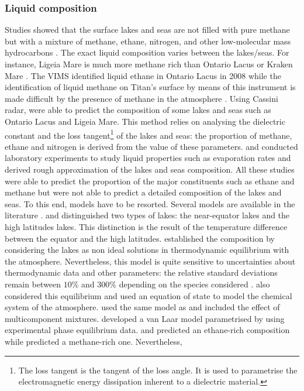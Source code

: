 \subsubsection{Liquid composition}
\label{sec:intro:composition}
Studies showed that the surface lakes and seas are not filled with pure methane but with a mixture of methane, ethane, nitrogen, and other low-molecular mass hydrocarbons \citep{ mastrogiuseppe2014bathymetry,luspay2015experimental,mitchell2015laboratory, tan2013titan,tan2015titan}. The exact liquid composition varies between the lakes/seas. For instance, Ligeia Mare is much more methane rich than Ontario Lacus or Kraken Mare \citep{hayes2016bathymetry,le2016composition}. The VIMS identified liquid ethane in Ontario Lacus in 2008 while the identification of liquid methane on Titan's surface by means of this instrument is made difficult by the presence of methane in the atmosphere \citep{brown2008identification}. Using Cassini radar, \citep{mastrogiuseppe2014bathymetry,hayes2016bathymetry,le2016composition} were able to predict the composition of some lakes and seas such as Ontario Lacus and Ligeia Mare. This method relies on analysing the dielectric constant and the loss tangent\footnote{The loss tangent is the tangent of the loss angle. It is used to parametrise the electromagnetic energy dissipation inherent to a dielectric material.} of the lakes and seas: the proportion of methane, ethane and nitrogen is derived from the value of these parameters. \citet{luspay2015experimental} and \citet{mitchell2015laboratory} conducted laboratory experiments to study liquid properties such as evaporation rates and derived rough approximation of the lakes and seas composition. All these studies were able to predict the proportion of the major constituents such as ethane and methane but were not able to predict a detailed composition of the lakes and seas. To this end, models have to be resorted. Several models are available in the literature \citep[see, e.g.,][]{cordier2009estimate,tan2013titan,tan2015titan,glein2013geochemical}. \citet{cordier2009estimate} and \citet{tan2013titan, tan2015titan} distinguished two types of lakes: the near-equator lakes and the high latitudes lakes. This distinction is the result of the temperature difference between the equator and the high latitudes. \citet{cordier2009estimate} established the composition by considering the lakes as non ideal solutions in thermodynamic equilibrium with the atmosphere. Nevertheless, this model is quite sensitive to uncertainties about thermodynamic data and other parameters: the relative standard deviations remain between $10\%$ and $300\%$ depending on the species considered \citep{cordier2012titan}. \citet{tan2013titan} also considered this equilibrium and used an equation of state to model the chemical system of the atmosphere. \citet{tan2015titan} used the same model as \citet{tan2013titan} and included the effect of multicomponent mixtures. \citet{glein2013geochemical} developed a van Laar model parametrised by using experimental phase equilibrium data. \citet{cordier2009estimate} and \citet{luspay2015experimental} predicted an ethane-rich composition while \citet{tan2013titan, tan2015titan} predicted a methane-rich one. Nevertheless, 